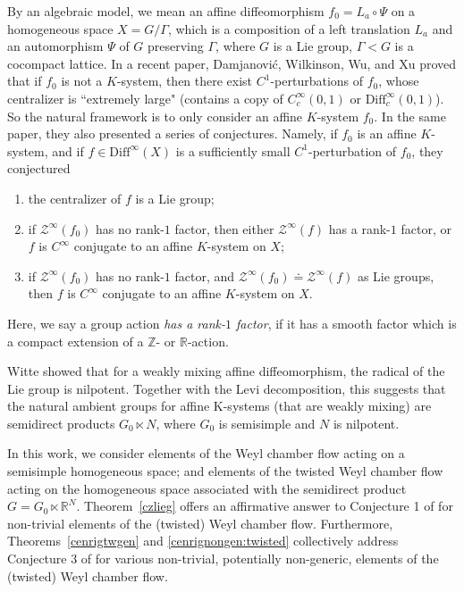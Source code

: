 \documentclass[11pt]{amsart}
\numberwithin{equation}{section}
\newcommand{\R}{\mathbb{R}}
\newcommand{\Z}{\mathbb{Z}}
\theoremstyle{plain}
\begin{document}
By an algebraic model, we mean an affine diffeomorphism $f_0 = L_a \circ \Psi$ on a homogeneous space $X=G/\Gamma$, which is a composition of a left translation $L_a$ and an automorphism $\Psi$ of \(G\) preserving \(\Gamma\), where $G$ is a Lie group, $\Gamma<G$ is a cocompact lattice. In a recent paper, Damjanović, Wilkinson, Wu, and Xu \cite{DWWX} proved that if $f_0$ is not a $K$-system, then there exist $C^1$-perturbations of $f_0$, whose centralizer is ``extremely large" (contains a copy of $C^\infty_c(0,1)$ or $\mathrm{Diff}^\infty_c(0,1)$). So the natural framework is to only consider an affine $K$-system $f_0$. In the same paper, they also presented a series of conjectures. Namely, if $f_0$ is an affine $K$-system, and if $f\in \mathrm{Diff}^\infty(X)$ is a sufficiently small $C^1$-perturbation of $f_0$, they conjectured \begin{enumerate}
    \item the centralizer of $f$ is a Lie group;
    
 \item if $\mathcal Z^\infty(f_0)$ has no rank-$1$ factor, then either $\mathcal Z^\infty(f)$ has a rank-$1$ factor, or $f$ is $C^\infty$ conjugate to an affine $K$-system on $X$; 
 
     \item if $\mathcal Z^\infty(f_0)$ has no rank-$1$ factor, and $\mathcal Z^\infty(f_0)\doteq \mathcal Z^\infty(f)$ as Lie groups, then $f$ is $C^\infty$ conjugate to an affine $K$-system on $X$.    
\end{enumerate}

Here, we say a group action \emph{has a rank-$1$ factor}, if it has a smooth factor which is a compact extension of a $\Z$- or $\R$-action. 

Witte \cite[Proposition 4.22]{WitteZeroEntropy} showed that for a weakly mixing affine diffeomorphism, the radical of the Lie group is nilpotent. Together with the Levi decomposition, this suggests that the natural
ambient groups for affine K-systems (that are weakly mixing) are semidirect products
\(G_0\ltimes N\), where \(G_0\) is semisimple and \(N\) is nilpotent.

In this work, we consider elements of the Weyl chamber flow acting on a semisimple homogeneous space; and elements of the twisted Weyl chamber flow acting on the homogeneous space associated with the semidirect product $G=G_0\ltimes \R^N$. Theorem~\ref{czlieg} offers an affirmative answer to Conjecture 1 of \cite{DWWX} for non-trivial elements of the (twisted) Weyl chamber flow. Furthermore, Theorems~\ref{cenrigtwgen} and  \ref{cenrignongen:twisted} collectively address Conjecture 3 of \cite{DWWX} for various non-trivial, potentially non-generic, elements of the (twisted) Weyl chamber flow.
\end{document}
